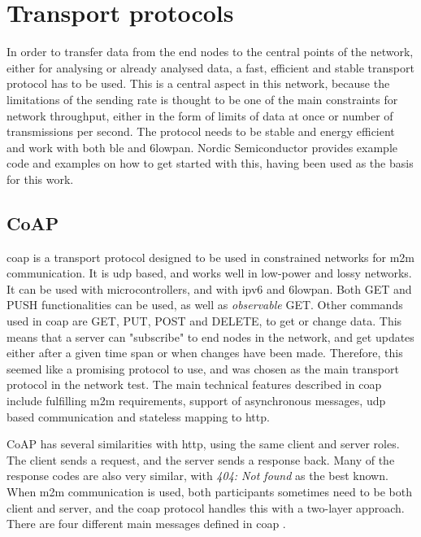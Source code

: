 

\section{Transport protocols}

\noindent In order to transfer data from the end nodes to the central points of the network, either for analysing or already analysed data, a fast, efficient and stable transport protocol has to be used. This is a central aspect in this network, because the limitations of the sending rate is thought to be one of the main constraints for network throughput, either in the form of limits of data at once or number of transmissions per second. The protocol needs to be stable and energy efficient and work with both \gls{ble} and \gls{6lowpan}. Nordic Semiconductor provides example code and examples on how to get started with this, having been used as the basis for this work.

\subsection{CoAP}

 
\noindent \gls{coap} is a transport protocol designed to be used in constrained networks for \gls{m2m} communication. It is \gls{udp} based, and works well in low-power and lossy networks. It can be used with \glspl{microcontroller}, and with \gls{ipv6} and \gls{6lowpan}. Both GET and PUSH functionalities can be used, as well as \textit{observable} GET. Other commands used in \gls{coap} are GET, PUT, POST and DELETE, to get or change data. This means that a server can "subscribe" to end nodes in the network, and get updates either after a given time span or when changes have been made. Therefore, this seemed like a promising protocol to use, and was chosen as the main transport protocol in the network test\cite{shelby2014constrained}. The main technical features described in \gls{coap} include fulfilling \gls{m2m} requirements, support of asynchronous messages, \gls{udp} based communication and stateless mapping to \gls{http}. 

\noindent CoAP has several similarities with \gls{http}, using the same client and server roles. The client sends a request, and the server sends a response back. Many of the response codes are also very similar, with \textit{404: Not found} as the best known. When \gls{m2m} communication is used, both participants sometimes need to be both client and server, and the \gls {coap} protocol handles this with a two-layer approach. There are four different main messages defined in \gls{coap} \cite{shelby2014constrained}. 

